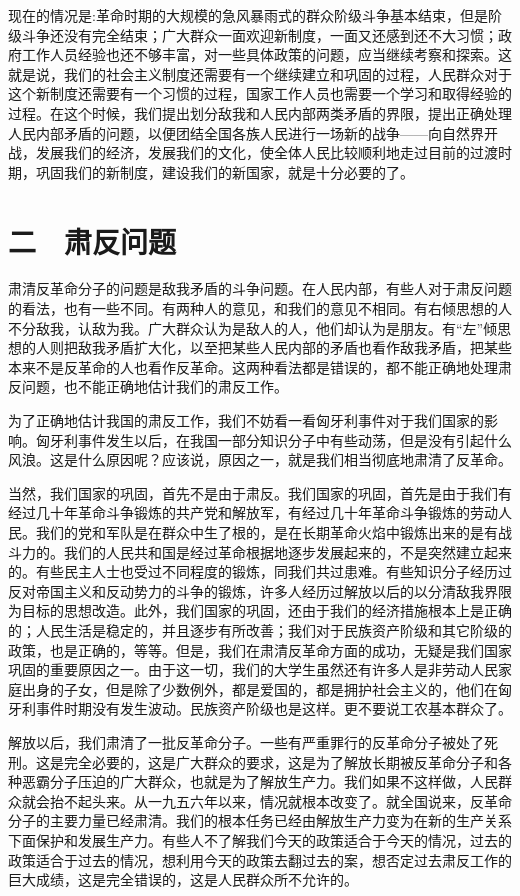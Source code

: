 现在的情况是:革命时期的大规模的急风暴雨式的群众阶级斗争基本结束，但是阶级斗争还没有完全结束；广大群众一面欢迎新制度，一面又还感到还不大习惯；政府工作人员经验也还不够丰富，对一些具体政策的问题，应当继续考察和探索。这就是说，我们的社会主义制度还需要有一个继续建立和巩固的过程，人民群众对于这个新制度还需要有一个习惯的过程，国家工作人员也需要一个学习和取得经验的过程。在这个时候，我们提出划分敌我和人民内部两类矛盾的界限，提出正确处理人民内部矛盾的问题，以便团结全国各族人民进行一场新的战争——向自然界开战，发展我们的经济，发展我们的文化，使全体人民比较顺利地走过目前的过渡时期，巩固我们的新制度，建设我们的新国家，就是十分必要的了。

\section{二　肃反问题}

肃清反革命分子的问题是敌我矛盾的斗争问题。在人民内部，有些人对于肃反问题的看法，也有一些不同。有两种人的意见，和我们的意见不相同。有右倾思想的人不分敌我，认敌为我。广大群众认为是敌人的人，他们却认为是朋友。有“左”倾思想的人则把敌我矛盾扩大化，以至把某些人民内部的矛盾也看作敌我矛盾，把某些本来不是反革命的人也看作反革命。这两种看法都是错误的，都不能正确地处理肃反问题，也不能正确地估计我们的肃反工作。

为了正确地估计我国的肃反工作，我们不妨看一看匈牙利事件对于我们国家的影响。匈牙利事件发生以后，在我国一部分知识分子中有些动荡，但是没有引起什么风浪。这是什么原因呢？应该说，原因之一，就是我们相当彻底地肃清了反革命。

当然，我们国家的巩固，首先不是由于肃反。我们国家的巩固，首先是由于我们有经过几十年革命斗争锻炼的共产党和解放军，有经过几十年革命斗争锻炼的劳动人民。我们的党和军队是在群众中生了根的，是在长期革命火焰中锻炼出来的是有战斗力的。我们的人民共和国是经过革命根据地逐步发展起来的，不是突然建立起来的。有些民主人士也受过不同程度的锻炼，同我们共过患难。有些知识分子经历过反对帝国主义和反动势力的斗争的锻炼，许多人经历过解放以后的以分清敌我界限为目标的思想改造。此外，我们国家的巩固，还由于我们的经济措施根本上是正确的；人民生活是稳定的，并且逐步有所改善；我们对于民族资产阶级和其它阶级的政策，也是正确的，等等。但是，我们在肃清反革命方面的成功，无疑是我们国家巩固的重要原因之一。由于这一切，我们的大学生虽然还有许多人是非劳动人民家庭出身的子女，但是除了少数例外，都是爱国的，都是拥护社会主义的，他们在匈牙利事件时期没有发生波动。民族资产阶级也是这样。更不要说工农基本群众了。

解放以后，我们肃清了一批反革命分子。一些有严重罪行的反革命分子被处了死刑。这是完全必要的，这是广大群众的要求，这是为了解放长期被反革命分子和各种恶霸分子压迫的广大群众，也就是为了解放生产力。我们如果不这样做，人民群众就会抬不起头来。从一九五六年以来，情况就根本改变了。就全国说来，反革命分子的主要力量已经肃清。我们的根本任务已经由解放生产力变为在新的生产关系下面保护和发展生产力。有些人不了解我们今天的政策适合于今天的情况，过去的政策适合于过去的情况，想利用今天的政策去翻过去的案，想否定过去肃反工作的巨大成绩，这是完全错误的，这是人民群众所不允许的。

